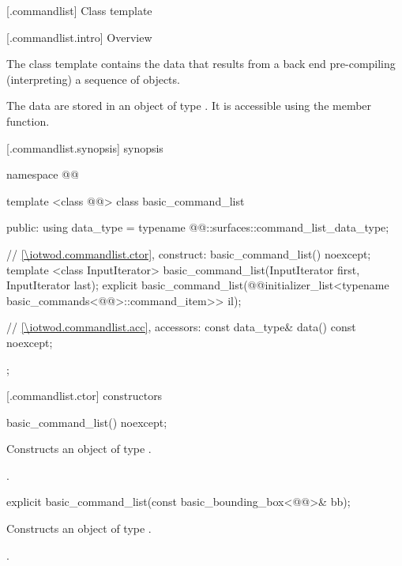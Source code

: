  [\iotwod.commandlist] {Class template }

 [\iotwod.commandlist.intro] {Overview}

\pnum
{}%
The class template  contains the data that results from a back end pre-compiling (interpreting) a sequence of  objects.

\pnum
The data are stored in an object of type . It is accessible using the  member function.

 [\iotwod.commandlist.synopsis] { synopsis}

\begin{codeblock}
namespace @\fullnamespace{}@ {
  template <class @\graphicssurfacestemplparamnospace{}@>
  class basic_command_list {
  public:
    using data_type = typename 
      @\graphicssurfacestemplparamnospace{}@::surfaces::command_list_data_type;
      
    // \ref{\iotwod.commandlist.ctor}, construct:
    basic_command_list() noexcept;
    template <class InputIterator>
    basic_command_list(InputIterator first, InputIterator last);
    explicit basic_command_list(@\stdqualifier{}@initializer_list<typename
      basic_commands<@\graphicssurfacestemplparamnospace{}@>::command_item>> il);    
    
    // \ref{\iotwod.commandlist.acc}, accessors:
    const data_type& data() const noexcept;
  };
}
\end{codeblock}

 [\iotwod.commandlist.ctor] { constructors}

%
\begin{itemdecl}
basic_command_list() noexcept;
\end{itemdecl}
\begin{itemdescr}
\pnum
\pnum
\effects
Constructs an object of type .

\pnum
\postconditions
{}.
\end{itemdescr}

%
\begin{itemdecl}
explicit basic_command_list(const basic_bounding_box<@\graphicsmathtemplparamnospace{}@>& bb);
\end{itemdecl}
\begin{itemdescr}
\pnum
\effects
Constructs an object of type .

\pnum
\postconditions
{}.
\end{itemdescr}

